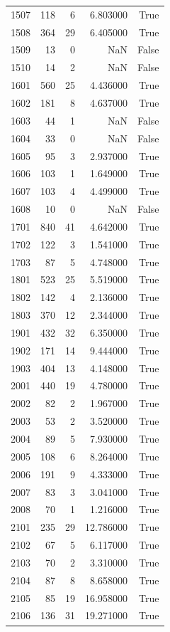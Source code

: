 \begin{longtable}{lrrrr}
1507 & 118 & 6 & 6.803000 & True \\
1508 & 364 & 29 & 6.405000 & True \\
1509 & 13 & 0 & NaN & False \\
1510 & 14 & 2 & NaN & False \\
1601 & 560 & 25 & 4.436000 & True \\
1602 & 181 & 8 & 4.637000 & True \\
1603 & 44 & 1 & NaN & False \\
1604 & 33 & 0 & NaN & False \\
1605 & 95 & 3 & 2.937000 & True \\
1606 & 103 & 1 & 1.649000 & True \\
1607 & 103 & 4 & 4.499000 & True \\
1608 & 10 & 0 & NaN & False \\
1701 & 840 & 41 & 4.642000 & True \\
1702 & 122 & 3 & 1.541000 & True \\
1703 & 87 & 5 & 4.748000 & True \\
1801 & 523 & 25 & 5.519000 & True \\
1802 & 142 & 4 & 2.136000 & True \\
1803 & 370 & 12 & 2.344000 & True \\
1901 & 432 & 32 & 6.350000 & True \\
1902 & 171 & 14 & 9.444000 & True \\
1903 & 404 & 13 & 4.148000 & True \\
2001 & 440 & 19 & 4.780000 & True \\
2002 & 82 & 2 & 1.967000 & True \\
2003 & 53 & 2 & 3.520000 & True \\
2004 & 89 & 5 & 7.930000 & True \\
2005 & 108 & 6 & 8.264000 & True \\
2006 & 191 & 9 & 4.333000 & True \\
2007 & 83 & 3 & 3.041000 & True \\
2008 & 70 & 1 & 1.216000 & True \\
2101 & 235 & 29 & 12.786000 & True \\
2102 & 67 & 5 & 6.117000 & True \\
2103 & 70 & 2 & 3.310000 & True \\
2104 & 87 & 8 & 8.658000 & True \\
2105 & 85 & 19 & 16.958000 & True \\
2106 & 136 & 31 & 19.271000 & True \\

\end{longtable}
